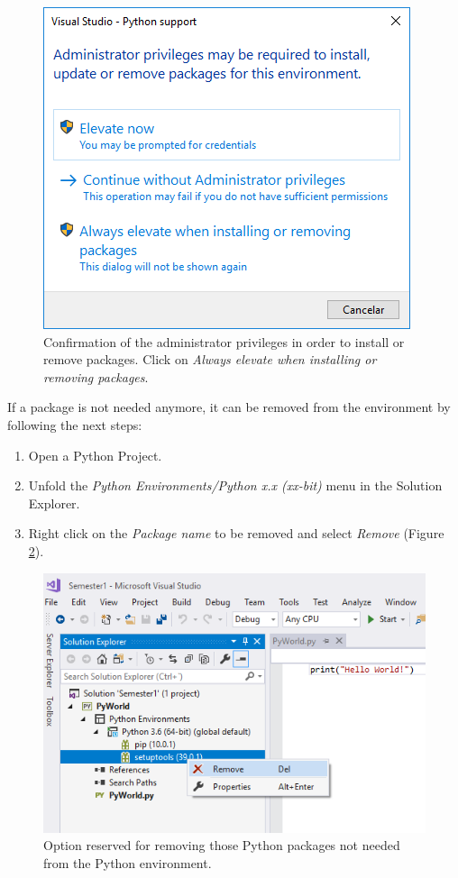 \begin{figure}[h]
	\centering
	\includegraphics[width=0.6 \textwidth]{Figures/PPM15.png}
	\caption{Confirmation of the administrator privileges in order to install or remove packages. Click on \textit{Always elevate when installing or removing packages}.}
	\label{fig:pkg15}
\end{figure}

\newpage
If a package is not needed anymore, it can be removed from the environment by following the next steps:

\begin{enumerate}
	\item Open a Python Project.
	\item Unfold the \textit{Python Environments/Python x.x (xx-bit)} menu in the Solution Explorer.
	\item Right click on the \textit{Package name} to be removed and select \textit{Remove} (Figure \ref{fig:pkg2}). 
\end{enumerate}

\begin{figure}[h]
    \centering
    \includegraphics[width= 0.9 \textwidth]{Figures/PPM2V1.png}
    \caption{Option reserved for removing those Python packages not needed from the Python environment.}
    \label{fig:pkg2}
\end{figure}

